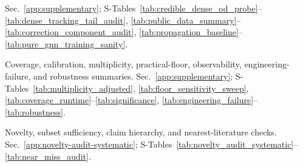 \documentclass{article}
\begin{document}
\begin{description}[nosep, itemsep=2pt, leftmargin=0pt, labelindent=0pt]
    Sec.~\ref{app:supplementary}; S-Tables~\ref{tab:credible_dense_od_probe}--\ref{tab:dense_tracking_tail_audit}, \ref{tab:public_data_summary}--\ref{tab:correction_component_audit}, \ref{tab:propagation_baseline}--\ref{tab:pure_gnn_training_sanity}.
  \item[Archival 6---Diagnostic robustness.]
    Coverage, calibration, multiplicity, practical-floor, observability, engineering-failure, and robustness summaries.
    Sec.~\ref{app:supplementary}; S-Tables~\ref{tab:multiplicity_adjusted}, \ref{tab:floor_sensitivity_sweep}, \ref{tab:coverage_runtime}--\ref{tab:significance}, \ref{tab:engineering_failure}--\ref{tab:robustness}.
  \item[Archival 7---Boundary audit.]
    Novelty, subset sufficiency, claim hierarchy, and nearest-literature checks.
    Sec.~\ref{app:novelty-audit-systematic}; S-Tables~\ref{tab:novelty_audit_systematic}--\ref{tab:near_miss_audit}.
\end{description}
\end{document}
